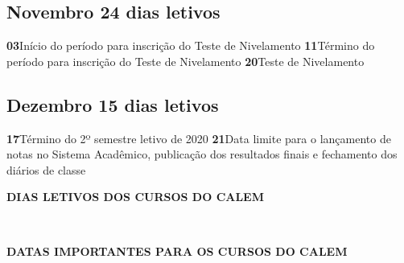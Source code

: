 \documentclass[thesis]{hmcposter}
\begin{document}
\begin{poster}
							\subsection{Novembro \hfill 24 dias letivos}\textbf{03}\qquad Início do período para inscrição do Teste de Nivelamento \newline\textbf{11}\qquad Término do período para inscrição do Teste de Nivelamento \newline\textbf{20}\qquad Teste de Nivelamento \subsection{Dezembro \hfill 15 dias letivos}\textbf{17}\qquad Término do 2º semestre letivo de 2020 \newline\textbf{21}\qquad Data limite para o lançamento de notas no Sistema Acadêmico, publicação dos resultados finais e fechamento dos diários de classe
 \newpage
	~
	\vfill
	\begin{center}
	\large \textbf{DIAS LETIVOS DOS CURSOS DO CALEM}
	\newline
	\null
	\newline
	\begin{table}
	\centering
	\end{table}
	\newline
	\null
	\newline
	\end{center}
	\vfill
	\null
	\columnbreak
	~
	\vfill
	\begin{center}
	\large \textbf{DATAS IMPORTANTES PARA OS CURSOS DO CALEM}
	\newline
	\null
	\newline
	\begin{table}
	\centering
\end{table}
\end{center}
\end{poster}
\end{document}
